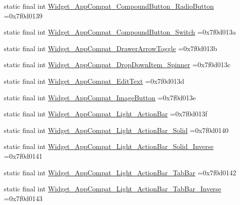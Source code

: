 \begin{DoxyCompactItemize}
\item 
static final int \mbox{\hyperlink{classcom_1_1example_1_1trainawearapplication_1_1_r_1_1style_add327368c84c624f820a50ea0b29ef46}{Widget\+\_\+\+App\+Compat\+\_\+\+Compound\+Button\+\_\+\+Radio\+Button}} =0x7f0d0139
\item 
static final int \mbox{\hyperlink{classcom_1_1example_1_1trainawearapplication_1_1_r_1_1style_a3cc63f9ca1cae5ce7d694ea99c721570}{Widget\+\_\+\+App\+Compat\+\_\+\+Compound\+Button\+\_\+\+Switch}} =0x7f0d013a
\item 
static final int \mbox{\hyperlink{classcom_1_1example_1_1trainawearapplication_1_1_r_1_1style_a24dc28b6606ac0097d7b74921bae35f4}{Widget\+\_\+\+App\+Compat\+\_\+\+Drawer\+Arrow\+Toggle}} =0x7f0d013b
\item 
static final int \mbox{\hyperlink{classcom_1_1example_1_1trainawearapplication_1_1_r_1_1style_ac863173bbbba7c1103f9cf6922080f04}{Widget\+\_\+\+App\+Compat\+\_\+\+Drop\+Down\+Item\+\_\+\+Spinner}} =0x7f0d013c
\item 
static final int \mbox{\hyperlink{classcom_1_1example_1_1trainawearapplication_1_1_r_1_1style_a9c817400f00bd2847f17d51eff5bf470}{Widget\+\_\+\+App\+Compat\+\_\+\+Edit\+Text}} =0x7f0d013d
\item 
static final int \mbox{\hyperlink{classcom_1_1example_1_1trainawearapplication_1_1_r_1_1style_a92190722ae73d2070d6e0697d712e774}{Widget\+\_\+\+App\+Compat\+\_\+\+Image\+Button}} =0x7f0d013e
\item 
static final int \mbox{\hyperlink{classcom_1_1example_1_1trainawearapplication_1_1_r_1_1style_a5337a06f8a68e145f1fa0f7ede1ebb80}{Widget\+\_\+\+App\+Compat\+\_\+\+Light\+\_\+\+Action\+Bar}} =0x7f0d013f
\item 
static final int \mbox{\hyperlink{classcom_1_1example_1_1trainawearapplication_1_1_r_1_1style_a3e954fc993820b0ce00f927e73af02de}{Widget\+\_\+\+App\+Compat\+\_\+\+Light\+\_\+\+Action\+Bar\+\_\+\+Solid}} =0x7f0d0140
\item 
static final int \mbox{\hyperlink{classcom_1_1example_1_1trainawearapplication_1_1_r_1_1style_a4db6558abb6fcef0766bf934baaab8ac}{Widget\+\_\+\+App\+Compat\+\_\+\+Light\+\_\+\+Action\+Bar\+\_\+\+Solid\+\_\+\+Inverse}} =0x7f0d0141
\item 
static final int \mbox{\hyperlink{classcom_1_1example_1_1trainawearapplication_1_1_r_1_1style_a0735d07c8557720bfaefc06be4b13d0d}{Widget\+\_\+\+App\+Compat\+\_\+\+Light\+\_\+\+Action\+Bar\+\_\+\+Tab\+Bar}} =0x7f0d0142
\item 
static final int \mbox{\hyperlink{classcom_1_1example_1_1trainawearapplication_1_1_r_1_1style_ab3e731d45e40d54c708e6d0ceb3a54d9}{Widget\+\_\+\+App\+Compat\+\_\+\+Light\+\_\+\+Action\+Bar\+\_\+\+Tab\+Bar\+\_\+\+Inverse}} =0x7f0d0143

\end{DoxyCompactItemize}
